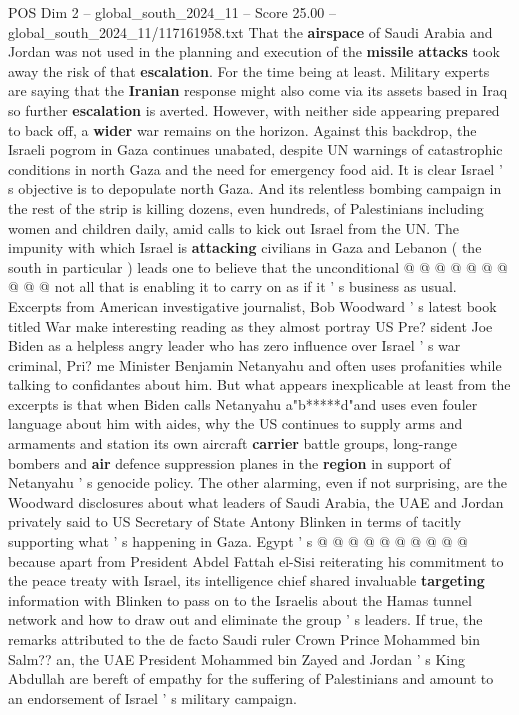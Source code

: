 \begin{textsample}{POS Dim 2 – global\_south\_2024\_11 – Score 25.00 – global\_south\_2024\_11/117161958.txt}
That the \textbf{airspace} of Saudi Arabia and Jordan was not used in the planning and execution of the \textbf{missile} \textbf{attacks} took away the risk of that \textbf{escalation}.
For the time being at least.
Military experts are saying that the \textbf{Iranian} response might also come via its assets based in Iraq so further \textbf{escalation} is averted.
However, with neither side appearing prepared to back off, a \textbf{wider} war remains on the horizon.
Against this backdrop, the Israeli pogrom in Gaza continues unabated, despite UN warnings of catastrophic conditions in north Gaza and the need for emergency food aid.
It is clear Israel ' s objective is to depopulate north Gaza.
And its relentless bombing campaign in the rest of the strip is killing dozens, even hundreds, of Palestinians including women and children daily, amid calls to kick out Israel from the UN.
The impunity with which Israel is \textbf{attacking} civilians in Gaza and Lebanon ( the south in particular ) leads one to believe that the unconditional @ @ @ @ @ @ @ @ @ @ not all that is enabling it to carry on as if it ' s business as usual.
Excerpts from American investigative journalist, Bob Woodward ' s latest book titled War make interesting reading as they almost portray US Pre? sident Joe Biden as a helpless angry leader who has zero influence over Israel ' s war criminal, Pri? me Minister Benjamin Netanyahu and often uses profanities while talking to confidantes about him.
But what appears inexplicable at least from the excerpts is that when Biden calls Netanyahu a"b*****d"and uses even fouler language about him with aides, why the US continues to supply arms and armaments and station its own aircraft \textbf{carrier} battle groups, long-range bombers and \textbf{air} defence suppression planes in the \textbf{region} in support of Netanyahu ' s genocide policy.
The other alarming, even if not surprising, are the Woodward disclosures about what leaders of Saudi Arabia, the UAE and Jordan privately said to US Secretary of State Antony Blinken in terms of tacitly supporting what ' s happening in Gaza.
Egypt ' s @ @ @ @ @ @ @ @ @ @ because apart from President Abdel Fattah el-Sisi reiterating his commitment to the peace treaty with Israel, its intelligence chief shared invaluable \textbf{targeting} information with Blinken to pass on to the Israelis about the Hamas tunnel network and how to draw out and eliminate the group ' s leaders.
If true, the remarks attributed to the de facto Saudi ruler Crown Prince Mohammed bin Salm?? an, the UAE President Mohammed bin Zayed and Jordan ' s King Abdullah are bereft of empathy for the suffering of Palestinians and amount to an endorsement of Israel ' s military campaign.

\end{textsample}
